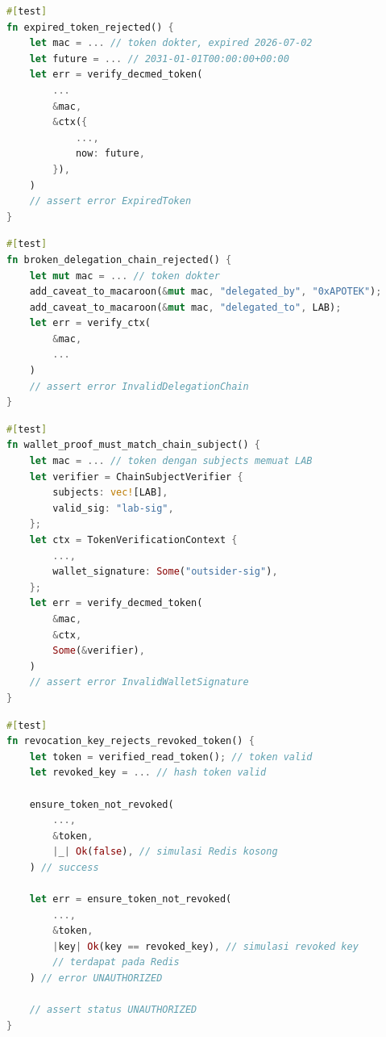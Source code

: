 \begin{lstlisting}[language=Rust, caption=Pengujian P-KNF-07 untuk KNF-TA-03, label=lst:kode-pengujian-knf-ta-03-a]
#[test]
fn expired_token_rejected() {
    let mac = ... // token dokter, expired 2026-07-02
    let future = ... // 2031-01-01T00:00:00+00:00
    let err = verify_decmed_token(
		...
        &mac,
        &ctx({
            ...,
            now: future,
        }),
    )
    // assert error ExpiredToken
}
\end{lstlisting}

\begin{lstlisting}[language=Rust, caption=Pengujian P-KNF-08 untuk KNF-TA-03, label=lst:kode-pengujian-knf-ta-03-b]
#[test]
fn broken_delegation_chain_rejected() {
    let mut mac = ... // token dokter
    add_caveat_to_macaroon(&mut mac, "delegated_by", "0xAPOTEK");
    add_caveat_to_macaroon(&mut mac, "delegated_to", LAB);
    let err = verify_ctx(
        &mac,
        ...
    )
    // assert error InvalidDelegationChain
}
\end{lstlisting}

\begin{lstlisting}[language=Rust, caption=Pengujian P-KNF-09 untuk KNF-TA-03 dan KNF-TA-06, label=lst:kode-pengujian-knf-ta-03-c]
#[test]
fn wallet_proof_must_match_chain_subject() {
    let mac = ... // token dengan subjects memuat LAB
    let verifier = ChainSubjectVerifier {
        subjects: vec![LAB],
        valid_sig: "lab-sig",
	};
    let ctx = TokenVerificationContext {
        ...,
        wallet_signature: Some("outsider-sig"),
    };
    let err = verify_decmed_token(
        &mac,
        &ctx,
        Some(&verifier),
    )
	// assert error InvalidWalletSignature
}
\end{lstlisting}

\begin{lstlisting}[language=Rust, caption=Pengujian P-KNF-11 untuk KNF-TA-05, label=lst:kode-pengujian-knf-ta-05-a]
#[test]
fn revocation_key_rejects_revoked_token() {
    let token = verified_read_token(); // token valid
    let revoked_key = ... // hash token valid

    ensure_token_not_revoked(
		...,
        &token,
        |_| Ok(false), // simulasi Redis kosong
    ) // success

    let err = ensure_token_not_revoked(
        ...,
        &token,
        |key| Ok(key == revoked_key), // simulasi revoked key 
		// terdapat pada Redis
    ) // error UNAUTHORIZED

    // assert status UNAUTHORIZED
}
\end{lstlisting}

